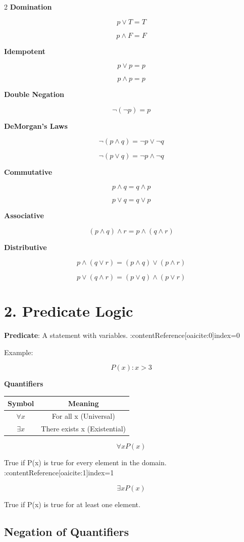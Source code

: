 \documentclass[10pt]{article}
\begin{document}
\begin{multicols}{2}
\textbf{Domination}

\[
p \lor T = T
\]

\[
p \land F = F
\]

\textbf{Idempotent}

\[
p \lor p = p
\]

\[
p \land p = p
\]

\textbf{Double Negation}

\[
\neg(\neg p) = p
\]

\textbf{DeMorgan's Laws}

\[
\neg(p \land q) = \neg p \lor \neg q
\]

\[
\neg(p \lor q) = \neg p \land \neg q
\]

\textbf{Commutative}

\[
p \land q = q \land p
\]

\[
p \lor q = q \lor p
\]

\textbf{Associative}

\[
(p \land q) \land r = p \land (q \land r)
\]

\textbf{Distributive}

\[
p \land (q \lor r) = (p \land q) \lor (p \land r)
\]

\[
p \lor (q \land r) = (p \lor q) \land (p \lor r)
\]

\section*{2. Predicate Logic}

\textbf{Predicate}: A statement with variables. :contentReference[oaicite:0]{index=0}

Example:

\[
P(x): x > 3
\]

\textbf{Quantifiers}

\begin{tabular}{c|c}
Symbol & Meaning \\
\hline
$\forall x$ & For all x (Universal) \\
$\exists x$ & There exists x (Existential)
\end{tabular}

\[
\forall x P(x)
\]

True if P(x) is true for every element in the domain. :contentReference[oaicite:1]{index=1}

\[
\exists x P(x)
\]

True if P(x) is true for at least one element.

\subsection*{Negation of Quantifiers}


\end{multicols}
\end{document}
